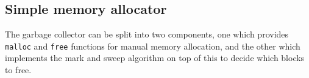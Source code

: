 %
%


\subsection{Simple memory allocator}
The garbage collector can be split into two components, one which provides \verb|malloc| and \verb|free| functions for manual memory allocation, and the other which implements the mark and sweep algorithm on top of this to decide which blocks to free. 

